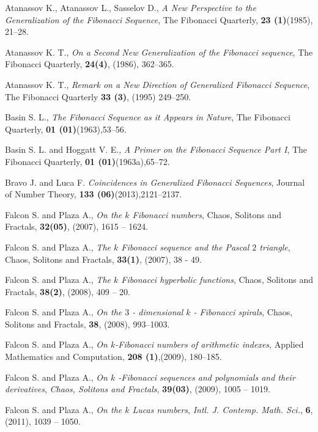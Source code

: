 \let\textcircled=\pgftextcircled
\begin{thebibliography}{00}
{Atanassov K., Atanassov L., Sasselov D., \emph{A New Perspective to the Generalization of the Fibonacci Sequence}, The Fibonacci Quarterly, \textbf{23 (1)}(1985), 21--28}.

{Atanassov K. T., \emph{On a Second New Generalization of the Fibonacci sequence}, The Fibonacci Quarterly, \textbf{24(4)}, (1986), 362--365.}

{Atanassov K. T., \emph{Remark on a New Direction of Generalized Fibonacci Sequence}, The Fibonacci Quarterly \textbf{33 (3)}, (1995) 249--250.}

{Basin S. L., \emph{ The Fibonacci Sequence as it Appears in Nature}, The Fibonacci Quarterly, \textbf{01 (01)}(1963),53--56}.

{Basin S. L. and  Hoggatt V. E., \emph{ A Primer on the Fibonacci Sequence Part I}, The Fibonacci Quarterly, \textbf{01 (01)}(1963a),65--72}.

{Bravo J. and Luca F. \emph{ Coincidences in Generalized Fibonacci Sequences}, Journal of Number Theory, \textbf{133 (06)}(2013),2121--2137}.

{Falcon S. and Plaza A., \emph{On the $k$ Fibonacci numbers}, {Chaos, Solitons and Fractals}, \textbf{32(05)}, (2007), 1615 -- 1624}.

{Falcon S. and Plaza A., \emph{The $k$ Fibonacci sequence and the Pascal $2$ triangle}, Chaos, Solitons and Fractals, \textbf{33(1)}, (2007), 38 - 49}.

{Falcon S. and Plaza A., {\emph{The $k$ Fibonacci hyperbolic functions}}, {Chaos, Solitons and Fractals}, {\textbf{38(2)}}, (2008), 409 -- 20}.

{Falcon S. and Plaza A., \emph{On the $3$ - dimensional $k$ - Fibonacci spirals}, {Chaos, Solitons and Fractals},  \textbf{38}, (2008), 993--1003.}

{Falcon S. and Plaza A., \emph{On $k $-Fibonacci numbers of arithmetic indexes}, {Applied Mathematics and Computation},  {\textbf{208 (1)}},(2009), 180--185.}

{Falcon S. and Plaza A., \emph{On $k$ -Fibonacci sequences and polynomials and their derivatives}, \emph{Chaos, Solitons and Fractals}, {\textbf{39(03)}}, (2009), 1005 -- 1019. }

{Falcon S. and Plaza A., \emph{On the $k$ Lucas numbers}, \emph{Intl. J. Contemp. Math. Sci.}, {\textbf{6}}, (2011), 1039 -- 1050.}


\end{thebibliography}
